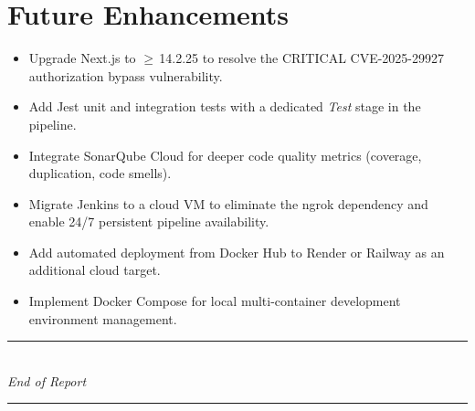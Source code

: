 \documentclass[12pt,a4paper,oneside]{report}
\begin{document}
\section{Future Enhancements}

\begin{itemize}
  \item Upgrade Next.js to $\geq$\,14.2.25 to resolve the CRITICAL CVE-2025-29927
        authorization bypass vulnerability.
  \item Add Jest unit and integration tests with a dedicated \emph{Test} stage in
        the pipeline.
  \item Integrate SonarQube Cloud for deeper code quality metrics (coverage,
        duplication, code smells).
  \item Migrate Jenkins to a cloud VM to eliminate the ngrok dependency and enable
        24/7 persistent pipeline availability.
  \item Add automated deployment from Docker Hub to Render or Railway as an
        additional cloud target.
  \item Implement Docker Compose for local multi-container development environment
        management.
\end{itemize}

\vspace{24pt}
\begin{center}
\rule{0.4\textwidth}{0.5pt}\\[6pt]
{\itshape End of Report}\\[4pt]
\rule{0.4\textwidth}{0.5pt}
\end{center}
\end{document}
